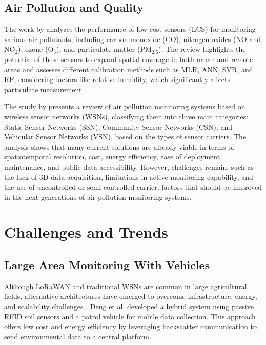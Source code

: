 \documentclass[conference]{IEEEtran}
\begin{document}
\subsection{Air Pollution and Quality}

The work by \cite{karagulian_2019_review} analyzes the performance of low-cost sensors (LCS) for monitoring various air pollutants, including carbon monoxide (CO), nitrogen oxides (NO and NO$_2$), ozone (O$_3$), and particulate matter (PM$_{2.5}$). The review highlights the potential of these sensors to expand spatial coverage in both urban and remote areas and assesses different calibration methods such as MLR, ANN, SVR, and RF, considering factors like relative humidity, which significantly affects particulate measurement.

The study by \cite{yi_2015_a} presents a review of air pollution monitoring systems based on wireless sensor networks (WSNs), classifying them into three main categories: Static Sensor Networks (SSN), Community Sensor Networks (CSN), and Vehicular Sensor Networks (VSN), based on the types of sensor carriers. The analysis shows that many current solutions are already viable in terms of spatiotemporal resolution, cost, energy efficiency, ease of deployment, maintenance, and public data accessibility. However, challenges remain, such as the lack of 3D data acquisition, limitations in active monitoring capability, and the use of uncontrolled or semi-controlled carrier, factors that should be improved in the next generations of air pollution monitoring systems.

\section{Challenges and Trends} \label{cap:challenges}

\subsection{Large Area Monitoring With Vehicles}

Although LoRaWAN and traditional WSNs are common in large agricultural fields, alternative architectures have emerged to overcome infrastructure, energy, and scalability challenges \cite{yellampalli_2021_wireless}. Deng et al. \cite{deng_2020_novel} developed a hybrid system using passive RFID soil sensors and a patrol vehicle for mobile data collection. This approach offers low cost and energy efficiency by leveraging backscatter communication to send environmental data to a central platform.
\end{document}

